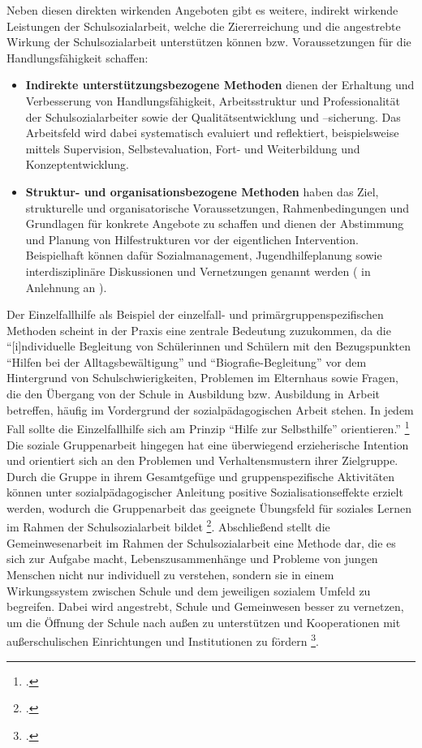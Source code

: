 \noindent
Neben diesen direkten wirkenden Angeboten gibt es weitere, indirekt wirkende Leistungen der Schulsozialarbeit, welche die Ziererreichung und die angestrebte Wirkung der Schulsozialarbeit unterstützen können bzw. Voraussetzungen für die Handlungsfähigkeit schaffen:
\begin{itemize}
	\item \textbf{Indirekte unterstützungsbezogene Methoden} dienen der Erhaltung und Verbesserung von Handlungsfähigkeit, Arbeitsstruktur und Professionalität der Schulsozialarbeiter sowie der Qualitätsentwicklung und –sicherung. Das Arbeitsfeld wird dabei systematisch evaluiert und reflektiert, beispielsweise mittels Supervision, Selbstevaluation, Fort- und Weiterbildung und Konzeptentwicklung. 
	\item \textbf{Struktur- und organisationsbezogene Methoden} haben das Ziel, strukturelle und organisatorische Voraussetzungen, Rahmenbedingungen und Grundlagen für konkrete Angebote zu schaffen und dienen der Abstimmung und Planung von Hilfestrukturen vor der eigentlichen Intervention. Beispielhaft können dafür Sozialmanagement, Jugendhilfeplanung sowie interdisziplinäre Diskussionen und Vernetzungen genannt werden (\cite[vgl.][96ff]{Stuewe2015} in Anlehnung an \cite[64f]{Speck2007}).
\end{itemize}

\noindent 
Der Einzelfallhilfe als Beispiel der einzelfall- und primärgruppenspezifischen Methoden scheint in der Praxis eine zentrale Bedeutung zuzukommen, da die "`[i]ndividuelle Begleitung von Schülerinnen und Schülern mit den Bezugspunkten "`Hilfen bei der Alltagsbewältigung"' und "`Biografie-Begleitung"' vor dem Hintergrund von Schulschwierigkeiten, Problemen im Elternhaus sowie Fragen, die den Übergang von der Schule in Ausbildung bzw. Ausbildung in Arbeit betreffen, häufig im Vordergrund der sozialpädagogischen Arbeit stehen. In jedem Fall sollte die Einzelfallhilfe sich am Prinzip "`Hilfe zur Selbsthilfe"' orientieren."' \footcite[23]{SMSSS2009} Die soziale Gruppenarbeit hingegen hat eine überwiegend erzieherische Intention und orientiert sich an den Problemen und Verhaltensmustern ihrer Zielgruppe. Durch die Gruppe in ihrem Gesamtgefüge und gruppenspezifische Aktivitäten können unter sozialpädagogischer Anleitung positive Sozialisationseffekte erzielt werden, wodurch die Gruppenarbeit das geeignete Übungsfeld für soziales Lernen im Rahmen der Schulsozialarbeit bildet \footcite[vgl.][24]{SMSSS2009}. Abschließend stellt die Gemeinwesenarbeit im Rahmen der Schulsozialarbeit eine Methode dar, die es sich zur Aufgabe macht, Lebenszusammenhänge und Probleme von jungen Menschen nicht nur individuell zu verstehen, sondern sie in einem Wirkungssystem zwischen Schule und dem jeweiligen sozialem Umfeld zu begreifen. Dabei wird angestrebt, Schule und Gemeinwesen besser zu vernetzen, um die Öffnung der Schule nach außen zu unterstützen und Kooperationen mit außerschulischen Einrichtungen und Institutionen zu fördern \footcite[vgl.][25]{SMSSS2009}. 

